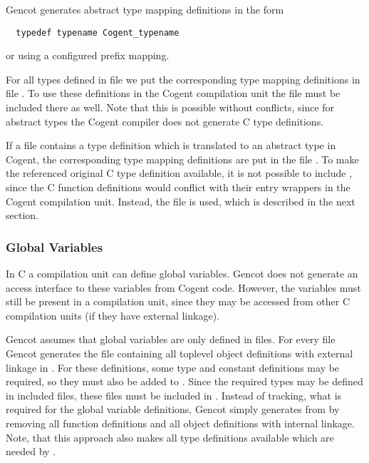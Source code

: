 Gencot generates abstract type mapping definitions in the form
\begin{verbatim}
  typedef typename Cogent_typename
\end{verbatim}
or using a configured prefix mapping.

For all types defined in file  we put the corresponding type mapping definitions in file . To use
these definitions in the Cogent compilation unit the file  must be included there as well. Note that this is 
possible without conflicts, since for abstract types the Cogent compiler does not generate C type definitions.

If a file  contains a type definition which is translated to an abstract type in Cogent, the corresponding
type mapping definitions are put in the file . To make the referenced original C type definition
available, it is not possible to include , since the C function definitions would conflict with their
entry wrappers in the Cogent compilation unit. Instead, the file  is used, which is described in the
next section.

\subsubsection{Global Variables}

In C a compilation unit can define global variables. Gencot does not generate an access interface to these variables
from Cogent code. However, the variables must still be present in a compilation unit, since they may be accessed
from other C compilation units (if they have external linkage). 

Gencot assumes that global variables are only defined in  files. For every file  Gencot generates
the file  containing all toplevel object definitions with external linkage in . For 
these definitions, some type and constant definitions may be required, so they must also be added to .
Since the required types may be defined in included  files, these files must be included in .
Instead of tracking, what is required for the global variable definitions, Gencot simply generates 
from  by removing all function definitions and all object definitions with internal linkage. Note, that
this approach also makes all type definitions available which are needed by .

